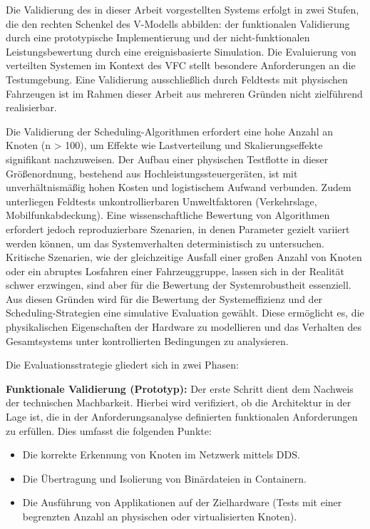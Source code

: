 Die Validierung des in dieser Arbeit vorgestellten Systems erfolgt in zwei Stufen, die den rechten Schenkel des V-Modells abbilden: der funktionalen Validierung durch eine prototypische Implementierung und der nicht-funktionalen Leistungsbewertung durch eine ereignisbasierte Simulation. Die Evaluierung von verteilten Systemen im Kontext des \gls{VFC} stellt besondere Anforderungen an die Testumgebung. Eine Validierung ausschließlich durch Feldtests mit physischen Fahrzeugen ist im Rahmen dieser Arbeit aus mehreren Gründen nicht zielführend realisierbar.

Die Validierung der Scheduling-Algorithmen erfordert eine hohe Anzahl an Knoten (n > 100), um Effekte wie Lastverteilung und Skalierungseffekte signifikant nachzuweisen. Der Aufbau einer physischen Testflotte in dieser Größenordnung, bestehend aus Hochleistungssteuergeräten, ist mit unverhältnismäßig hohen Kosten und logistischem Aufwand verbunden. Zudem unterliegen Feldtests unkontrollierbaren Umweltfaktoren (Verkehrslage, Mobilfunkabdeckung). Eine wissenschaftliche Bewertung von Algorithmen erfordert jedoch reproduzierbare Szenarien, in denen Parameter gezielt variiert werden können, um das Systemverhalten deterministisch zu untersuchen. Kritische Szenarien, wie der gleichzeitige Ausfall einer großen Anzahl von Knoten oder ein abruptes Losfahren einer Fahrzeuggruppe, lassen sich in der Realität schwer erzwingen, sind aber für die Bewertung der Systemrobustheit essenziell. Aus diesen Gründen wird für die Bewertung der Systemeffizienz und der Scheduling-Strategien eine simulative Evaluation gewählt. Diese ermöglicht es, die physikalischen Eigenschaften der Hardware zu modellieren und das Verhalten des Gesamtsystems unter kontrollierten Bedingungen zu analysieren.

Die Evaluationsstrategie gliedert sich in zwei Phasen:

\textbf{Funktionale Validierung (Prototyp):} Der erste Schritt dient dem Nachweis der technischen Machbarkeit. Hierbei wird verifiziert, ob die Architektur in der Lage ist, die in der Anforderungsanalyse definierten funktionalen Anforderungen zu erfüllen. Dies umfasst die folgenden Punkte:

\begin{itemize}
    \item Die korrekte Erkennung von Knoten im Netzwerk mittels DDS.
    \item Die Übertragung und Isolierung von Binärdateien in Containern.
    \item Die Ausführung von Applikationen auf der Zielhardware (Tests mit einer begrenzten Anzahl an physischen oder virtualisierten Knoten).
\end{itemize}


